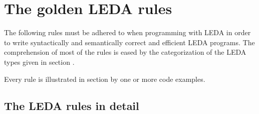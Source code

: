 


    \chapter{The golden LEDA rules}
    

    

    

    

    

 The following rules must be adhered to when programming with
    LEDA in order to write syntactically and semantically correct
    and efficient LEDA programs. The comprehension of most of the
    rules is eased by the categorization of the LEDA types given in
    section .



 Every rule is illustrated in section 
by one or more code examples.
    


    
      \section{The LEDA rules in detail}

